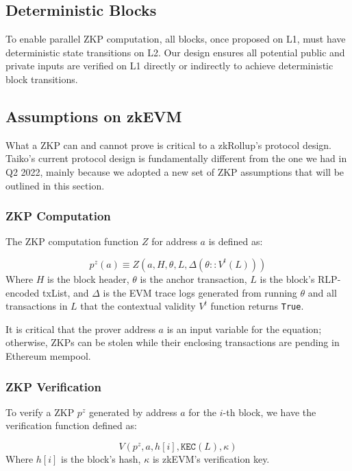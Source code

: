 \documentclass[9pt,oneside]{amsart}
\begin{document}
\begin{multicols}{2}
\subsection{Deterministic Blocks}
To enable parallel ZKP computation, all blocks, once proposed on L1, must have deterministic state transitions on L2. Our design ensures all potential public and private inputs are verified on L1 directly or indirectly to achieve deterministic block transitions.

\subsection{Assumptions on zkEVM}

What a ZKP can and cannot prove is critical to a zkRollup's protocol design. Taiko's current protocol design is fundamentally different from the one we had in Q2 2022, mainly because we adopted a new set of ZKP assumptions that will be outlined in this section.


\subsubsection{ZKP Computation} The ZKP computation function $Z$ for address $a$ is defined as:


\begin{equation}
    p^z(a) \equiv Z(a, H,\theta, L, \Delta(\theta::V^t(L)) )
\end{equation}
Where $H$ is the block header, $\theta$ is the anchor transaction, $L$ is the block's RLP-encoded txList, and $\Delta$ is the EVM trace logs generated from running $\theta$ and all transactions in $L$ that the contextual validity $V^t$ function returns \texttt{True}.

It is critical that the prover address $a$ is an input variable for the equation; otherwise, ZKPs can be stolen while their enclosing transactions are pending in Ethereum mempool.

\subsubsection{ZKP Verification} To verify a ZKP $p^z$ generated by address $a$ for the $i$-th block, we have the verification function defined as:

\begin{equation}
    V(p^z, a, h[i], \texttt{KEC}(L), \kappa)
\end{equation}
Where $h[i]$ is the block's hash, $\kappa$ is  zkEVM's verification key.

\end{multicols}
\end{document}

